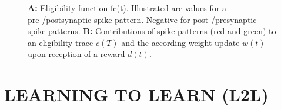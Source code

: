 \documentclass[letterpaper, 10 pt, conference]{ieeeconf}  %
\begin{document}
\begin{figure}[thpb]
        \centering
  \caption{\textbf{A:} Eligibility function fc(t). Illustrated are values for a pre-/postsynaptic spike pattern. Negative for
  post-/presynaptic spike patterns. \newline
  \textbf{B:} Contributions of spike patterns (red and green) to an eligibility trace $c(T)$ and the according
  weight update $w(t)$ upon reception of a reward $d(t)$.\cite{legensteinLearningTheoryRewardModulated2008} }
        \label{figurelabel}
     \end{figure}

\section{LEARNING TO LEARN (L2L)}
\end{document}
